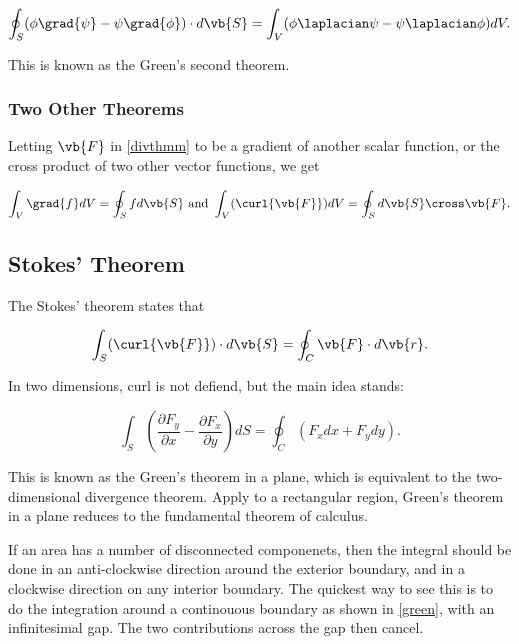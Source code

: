 \documentclass[english,a4paper,12pt]{report}
\begin{document}
\begin{equation}
	\oint_{S} (\phi \grad{\psi } - \psi \grad{\phi } ) \cdot d\vb{S}  = \int_{V}^{} (\phi \laplacian \psi - \psi \laplacian \phi ) dV. 
\end{equation}

This is known as the Green's second theorem.

\subsubsection{Two Other Theorems}

Letting \(\vb{F} \) in \cref{divthmm} to be a gradient of another scalar function, or the cross product of two other vector functions, we get 

\begin{equation}
	\int_{V}^{} \grad{f} dV = \oint_{S} fd\vb{S} \text { and } \int_{V}^{} (\curl{\vb{F} }) dV = \oint_{S} d\vb{S} \cross \vb{F} .     
\end{equation}

\subsection{Stokes' Theorem}
The Stokes' theorem states that 

\begin{equation} \label{stothmm} 
	\int_{S}^{} (\curl{\vb{F} } ) \cdot d\vb{S}  = \oint_{C} \vb{F} \cdot d\vb{r} .
\end{equation}

In two dimensions, curl is not defiend, but the main idea stands:

\begin{equation}
	\int_{S}^{} \left( \frac{\partial F_{y} }{\partial x} - \frac{\partial F_{x} }{\partial y}  \right) dS = \oint_{C} (F_{x} dx+F_{y} dy). 
\end{equation}

This is known as the Green's theorem in a plane, which is equivalent to the two-dimensional divergence theorem. Apply to a rectangular region, Green's theorem in a plane reduces to the fundamental theorem of calculus.

If an area has a number of disconnected componenets, then the integral should be done in an anti-clockwise direction around the exterior boundary, and in a clockwise direction on any interior boundary. The quickest way to see this is to do the integration around a continouous boundary as shown in \cref{green}, with an infinitesimal gap. The two contributions across the gap then cancel.
\end{document}
